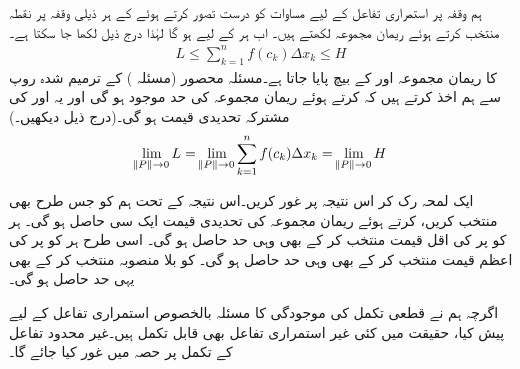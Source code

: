 ہم  وقفہ  پر استمراری تفاعل  کے لیے مساوات  کو درست تصور کرتے ہوئے   کے ہر  ذیلی وقفہ  پر نقطہ  منتخب کرتے ہوئے  ریمان مجموعہ  لکھتے ہیں۔  اب ہر  کے لیے  ہو گا لہٰذا درج ذیل لکھا جا سکتا ہے۔
\begin{align*}
L\le \sum\limits_{k=1}^nf(c_k)\Delta x_k\le H
\end{align*}
 کا ریمان مجموعہ  اور  کے بیچ پایا جاتا ہے۔مسئلہ محصور (مسئلہ )  کے  ترمیم شدہ روپ سے ہم اخذ کرتے ہیں کہ  کرتے ہوئے ریمان مجموعہ کی حد موجود ہو گی  اور یہ  اور  کی مشترکہ تحدیدی قیمت ہو گی۔(درج ذیل دیکھیں۔)
\begin{align*}
\lim_{\norm{P}\to0}L=\lim_{\norm{P}\to0}\sum\limits_{k=1}^nf(c_k)\Delta x_k=\lim_{\norm{P}\to0}H
\end{align*}

ایک لمحہ رک کر اس نتیجہ پر غور کریں۔اس نتیجہ کے تحت ہم  کو جس طرح بھی منتخب کریں،  کرتے ہوئے ریمان مجموعہ کی تحدیدی قیمت  ایک سی  حاصل ہو گی۔ ہر  کو  پر  کی اقل  قیمت منتخب کر کے بھی وہی حد حاصل ہو گی۔ اسی طرح ہر  کو  پر  کی  اعظم    قیمت منتخب کر کے بھی وہی حد حاصل ہو گی۔   کو بلا منصوبہ منتخب کر کے بھی یہی حد حاصل ہو گی۔

اگرچہ ہم نے قطعی تکمل کی موجودگی کا مسئلہ بالخصوص استمراری تفاعل کے لیے پیش کیا، حقیقت میں کئی غیر استمراری تفاعل بھی قابل تکمل ہیں۔غیر محدود تفاعل کے  تکمل پر حصہ  میں غور کیا جائے گا۔



